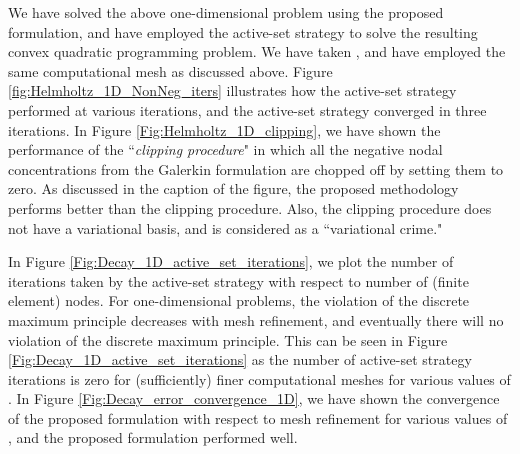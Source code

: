 \documentclass[11pt]{amsart}
\begin{document}
We have solved the above one-dimensional problem using the proposed formulation, and have 
employed the active-set strategy to solve the resulting convex quadratic programming problem. 
We have taken , and have employed the same computational mesh as discussed 
above. Figure \ref{fig:Helmholtz_1D_NonNeg_iters} illustrates how the active-set strategy 
performed at various iterations, and the active-set strategy converged in three iterations. 
In Figure \ref{Fig:Helmholtz_1D_clipping}, we have shown the performance of the ``\emph{clipping 
procedure}" in which all the negative nodal concentrations from the Galerkin formulation 
are chopped off by setting them to zero. As discussed in the caption of the figure, the 
proposed methodology performs better than the clipping procedure. Also, the clipping 
procedure does not have a variational basis, and is considered as a ``variational crime."

In Figure \ref{Fig:Decay_1D_active_set_iterations}, we plot the number of iterations taken 
by the active-set strategy with respect to number of (finite element) nodes. For one-dimensional 
problems, the violation of the discrete maximum principle decreases with mesh refinement, and 
eventually there will no violation of the discrete maximum principle. This can be seen in Figure 
\ref{Fig:Decay_1D_active_set_iterations} as the number of active-set strategy iterations is zero 
for (sufficiently) finer computational meshes for various values of .  In Figure 
\ref{Fig:Decay_error_convergence_1D}, we have shown the convergence of the proposed 
formulation with respect to mesh refinement for various values of , and the 
proposed formulation performed well. 
\end{document}
